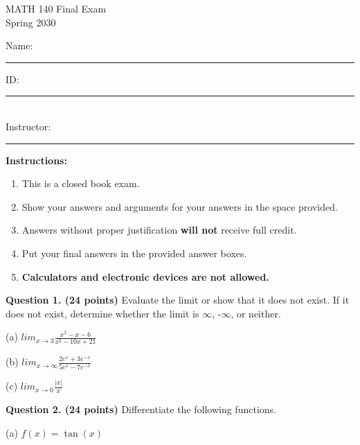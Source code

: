 \documentclass[11pt]{article}
\begin{document}
\begin{center}
\noindent
{\Large \sc MATH 140 Final Exam} \\
Spring 2030\\
\vspace{20pt}

\end{center}
\noindent Name: \rule{7.5cm}{.1mm} \hfill ID:\rule{3cm}{.1mm} \vspace{1cm}\\
\vspace{2cm}\noindent Instructor: \rule{7.5cm}{.1mm}

\vspace{10pt} \textbf{Instructions:}
\begin{enumerate}
  \item This is a closed book exam.
  \item Show your answers and arguments for your answers in the space provided.
  \item Answers without proper justification \textbf{will not} receive full credit.
  \item Put your final answers in the provided answer boxes.
  \item \textbf{Calculators and electronic devices are not allowed.}
\end{enumerate}



\newpage


\textbf{Question 1. (24 points)} 
Evaluate the limit or show that it does not exist. If it does not exist, 
determine whether the limit is $\infty$, -$\infty$, or neither. 
   
(a)  $lim_{x\to3} \displaystyle \frac{x^2-x-6}{x^2-10x+21}$

\vspace{6.5cm}

(b)  $lim_{x\to\infty} \displaystyle \frac{2e^x+3e^{-x}}{5e^x-7e^{-x}}$

\vspace{6.5cm}

(c)  $lim_{x\to0} \displaystyle \frac{|x|}{x}$


\newpage

\textbf{\large Question 2. (24 points)}
Differentiate the following functions.

(a) $f(x) = \tan(x)$
\end{document}
